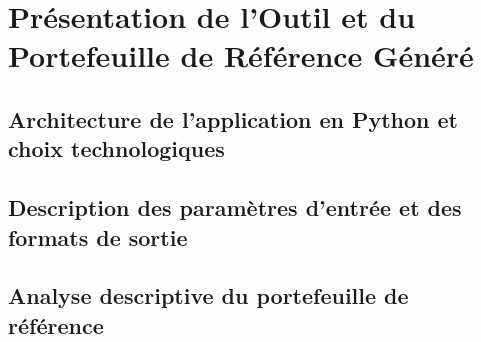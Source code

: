 \section{Présentation de l'Outil et du Portefeuille de Référence Généré}
\subsection{Architecture de l'application en Python et choix technologiques}
\subsection{Description des paramètres d'entrée et des formats de sortie}
\subsection{Analyse descriptive du portefeuille de référence}






